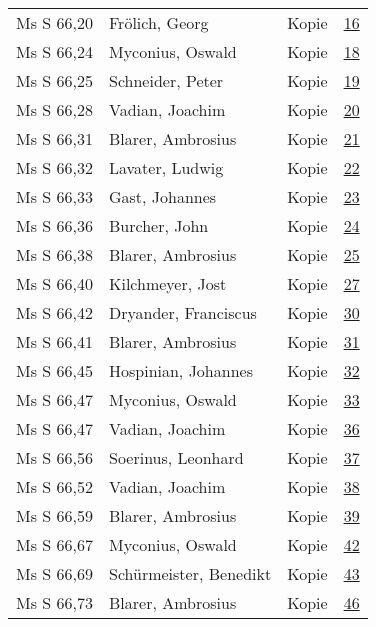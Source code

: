\documentclass[10pt,a4paper,landscape]{report}
\begin{document}
\begin{longtable}{p{16cm}p{4cm}lr}
Ms S 66,20	&	Frölich, Georg	&	Kopie	&	\href{http://130.60.24.72/assignment/16}{16}\\
Ms S 66,24	&	Myconius, Oswald	&	Kopie	&	\href{http://130.60.24.72/assignment/18}{18}\\
Ms S 66,25	&	Schneider, Peter	&	Kopie	&	\href{http://130.60.24.72/assignment/19}{19}\\
Ms S 66,28	&	Vadian, Joachim	&	Kopie	&	\href{http://130.60.24.72/assignment/20}{20}\\
Ms S 66,31	&	Blarer, Ambrosius	&	Kopie	&	\href{http://130.60.24.72/assignment/21}{21}\\
Ms S 66,32	&	Lavater, Ludwig	&	Kopie	&	\href{http://130.60.24.72/assignment/22}{22}\\
Ms S 66,33	&	Gast, Johannes	&	Kopie	&	\href{http://130.60.24.72/assignment/23}{23}\\
Ms S 66,36	&	Burcher, John	&	Kopie	&	\href{http://130.60.24.72/assignment/24}{24}\\
Ms S 66,38	&	Blarer, Ambrosius	&	Kopie	&	\href{http://130.60.24.72/assignment/25}{25}\\
Ms S 66,40	&	Kilchmeyer, Jost	&	Kopie	&	\href{http://130.60.24.72/assignment/27}{27}\\
Ms S 66,42	&	Dryander, Franciscus	&	Kopie	&	\href{http://130.60.24.72/assignment/30}{30}\\
Ms S 66,41	&	Blarer, Ambrosius	&	Kopie	&	\href{http://130.60.24.72/assignment/31}{31}\\
Ms S 66,45	&	Hospinian, Johannes	&	Kopie	&	\href{http://130.60.24.72/assignment/32}{32}\\
Ms S 66,47	&	Myconius, Oswald	&	Kopie	&	\href{http://130.60.24.72/assignment/33}{33}\\
Ms S 66,47	&	Vadian, Joachim	&	Kopie	&	\href{http://130.60.24.72/assignment/36}{36}\\
Ms S 66,56	&	Soerinus, Leonhard	&	Kopie	&	\href{http://130.60.24.72/assignment/37}{37}\\
Ms S 66,52	&	Vadian, Joachim	&	Kopie	&	\href{http://130.60.24.72/assignment/38}{38}\\
Ms S 66,59	&	Blarer, Ambrosius	&	Kopie	&	\href{http://130.60.24.72/assignment/39}{39}\\
Ms S 66,67	&	Myconius, Oswald	&	Kopie	&	\href{http://130.60.24.72/assignment/42}{42}\\
Ms S 66,69	&	Schürmeister, Benedikt	&	Kopie	&	\href{http://130.60.24.72/assignment/43}{43}\\
Ms S 66,73	&	Blarer, Ambrosius	&	Kopie	&	\href{http://130.60.24.72/assignment/46}{46}\\

\end{longtable}
\end{document}
